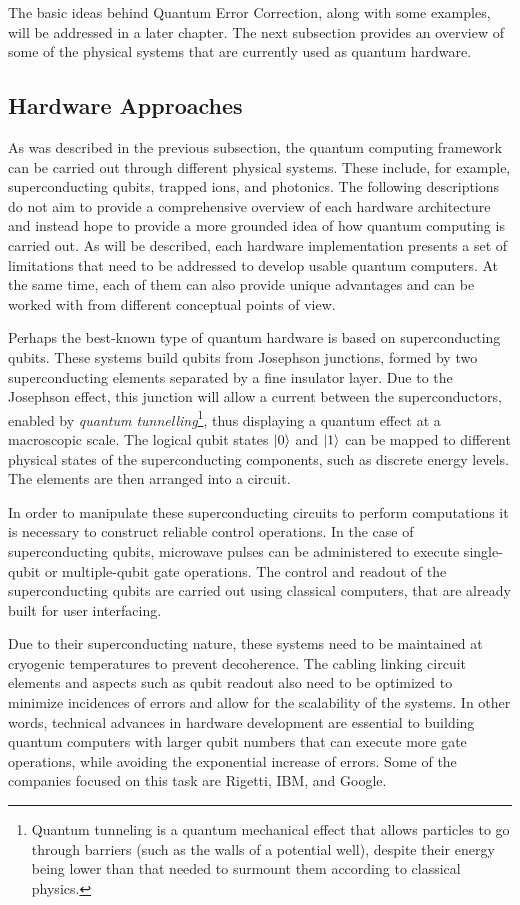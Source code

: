 The basic ideas behind Quantum Error Correction, along with some examples, will be addressed in a later chapter. The next subsection provides an overview of some of the physical systems that are currently used as quantum hardware.

\subsection{Hardware Approaches}

As was described in the previous subsection, the quantum computing framework can be carried out through different physical systems. These include, for example, superconducting qubits, trapped ions, and photonics. The following descriptions do not aim to provide a comprehensive overview of each hardware architecture and instead hope to provide a more grounded idea of how quantum computing is carried out. As will be described, each hardware implementation presents a set of limitations that need to be addressed to develop usable quantum computers. At the same time, each of them can also provide unique advantages and can be worked with from different conceptual points of view. 

Perhaps the best-known type of quantum hardware is based on superconducting qubits. These systems build qubits from Josephson junctions, formed by two superconducting elements separated by a fine insulator layer. Due to the Josephson effect, this junction will allow a current between the superconductors, enabled by \textit{quantum tunnelling}\footnote{Quantum tunneling is a quantum mechanical effect that allows particles to go through barriers (such as the walls of a potential well), despite their energy being lower than that needed to surmount them according to classical physics.}, thus displaying a quantum effect at a macroscopic scale. The logical qubit states $\ket{0}$ and $\ket{1}$ can be mapped to different physical states of the superconducting components, such as discrete energy levels. The elements are then arranged into a circuit. 

In order to manipulate these superconducting circuits to perform computations it is necessary to construct reliable control operations. In the case of superconducting qubits, microwave pulses can be administered to execute single-qubit or multiple-qubit gate operations. The control and readout of the superconducting qubits are carried out using classical computers, that are already built for user interfacing.

Due to their superconducting nature, these systems need to be maintained at cryogenic temperatures to prevent decoherence. The cabling linking circuit elements and aspects such as qubit readout also need to be optimized to minimize incidences of errors and allow for the scalability of the systems. In other words, technical advances in hardware development are essential to building quantum computers with larger qubit numbers that can execute more gate operations, while avoiding the exponential increase of errors. Some of the companies focused on this task are Rigetti, IBM, and Google\cite{IBMtec,rigetti}.

